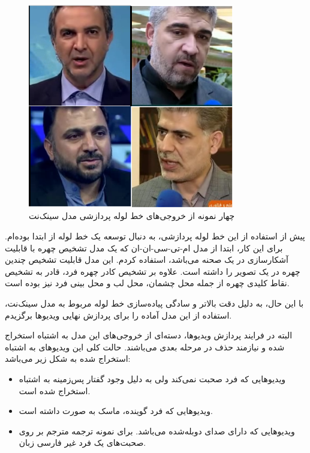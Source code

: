 \begin{figure}[!h]
	\centering
	\captionsetup{justification=centering}
	\includegraphics[width=9cm]{images/syncnet-sample}
	\caption{چهار نمونه از خروجی‌های خط لوله پردازشی مدل سینک‌نت}
	\label{fig:syncnet-sample}
\end{figure}

پیش از استفاده از این خط لوله پردازشی، به دنبال توسعه یک خط لوله از ابتدا بوده‌ام. برای این کار، ابتدا از مدل ام-تی-سی-ان-ان
که یک مدل تشخیص چهره با قابلیت آشکارسازی در یک صحنه
می‌باشد، استفاده کردم. این مدل قابلیت تشخیص چندین چهره در یک تصویر را داشته است. علاوه بر تشخیص کادر چهره فرد، قادر به تشخیص نقاط کلیدی چهره از جمله محل چشمان، محل لب و محل بینی فرد نیز بوده است.

با این حال، به دلیل دقت بالاتر و سادگی پیاده‌سازی خط لوله مربوط به مدل سینک‌نت، استفاده از این مدل آماده را برای پردازش نهایی ویدیو‌ها برگزیدم.

البته در فرایند پردازش ویدیو‌ها، دسته‌ای از خروجی‌های این مدل به اشتباه استخراج شده و نیازمند حذف در مرحله بعدی می‌باشند. حالت کلی این ویدیو‌های به اشتباه استخراج شده به شکل زیر می‌باشد:

\begin{itemize}
	\item ویدیو‌هایی که فرد صحبت نمی‌کند ولی به دلیل وجود گفتار پس‌زمینه به اشتباه استخراج شده است.
	\item ویدیو‌هایی که فرد گوینده، ماسک به صورت داشته است.
	\item ویدیو‌هایی که دارای صدای دوبله‌شده می‌باشد. برای نمونه ترجمه مترجم بر روی صحبت‌های یک فرد غیر فارسی زبان.
\end{itemize}

